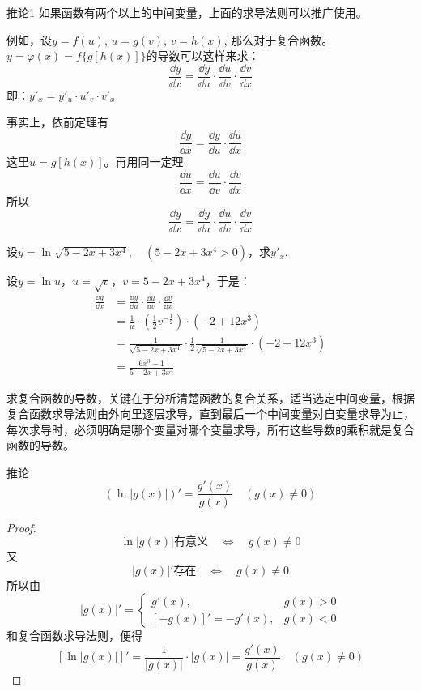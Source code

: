 \begin{blk}
{推论1} 如果函数有两个以上的中间变量，上面的求导法则可以推广使用。
\end{blk}

例如，设$y=f(u)$, $u=g(v)$, $v=h(x)$, 那么对于复合函数。$y=\varphi (x)=f\{g[h(x)]\}$的导数可以这样来求：
\[\frac{\dd y}{\dd x}=\frac{\dd y}{\dd u}\cdot \frac{\dd u}{\dd v}\cdot \frac{\dd v}{\dd x}\]
即：$y'_x=y'_u\cdot u'_v\cdot v'_x$

事实上，依前定理有
\[\frac{\dd y}{\dd x}=\frac{\dd y}{\dd u}\cdot \frac{\dd u}{\dd x}\]
这里$u=g[h(x)]$。再用同一定理
\[\frac{\dd u}{\dd x}=\frac{\dd u}{\dd v}\cdot \frac{\dd v}{\dd x}\]
所以
\[\frac{\dd y}{\dd x}=\frac{\dd y}{\dd u}\cdot \frac{\dd u}{\dd v}\cdot \frac{\dd v}{\dd x}\]


\begin{example}
    设$y=\ln\sqrt{5-2x+3x^4},\quad (5-2x+3x^4>0)$，求$y'_x$.
\end{example}

    
\begin{solution}
    设$y=\ln u$，$u=\sqrt{v}$，$v=5-2x+3x^4$，于是：
\[\begin{split}
    \frac{\dd y}{\dd x}&=\frac{\dd y}{\dd u}\cdot \frac{\dd u}{\dd v}\cdot \frac{\dd v}{\dd x}\\
    &=\frac{1}{u}\cdot \left(\frac{1}{2}v^{-\tfrac{1}{2}}\right)\cdot (-2+12x^3)\\
    &=\frac{1}{\sqrt{5-2x+3x^4}}\cdot \frac{1}{2}\frac{1}{\sqrt{5-2x+3x^4}}\cdot (-2+12x^3)\\
    &=\frac{6x^3-1}{5-2x+3x^4}
\end{split}\]
\end{solution}

求复合函数的导数，关键在于分析清楚函数的复合关系，适当选定中间变量，根据复合函数求导法则由外向里逐层求导，直到最后一个中间变量对自变量求导为止，每次求导时，必须明确是哪个变量对哪个变量求导，所有这些导数的乘积就是复合函数的导数。

\begin{blk}{推论}
    \[(\ln|g(x)|)'=\frac{g'(x)}{g(x)}\quad (g(x)\ne 0)\]
\end{blk}

\begin{proof}
  \[\ln|g(x)|\text{有意义}\quad \Longleftrightarrow\quad g(x)\ne 0\]  
又
\[|g(x)|'\text{存在}\quad \Longleftrightarrow\quad g(x)\ne 0\]
所以由
\[|g(x)|'=\begin{cases}
    g'(x) ,  & g(x)>0\\
    [-g(x)]'=-g'(x), & g(x)<0
\end{cases}\]
和复合函数求导法则，便得
\[[\ln|g(x)|]'=\frac{1}{|g(x)|}\cdot |g(x)|=\frac{g'(x)}{g(x)}\quad (g(x)\ne 0)\]
\end{proof}


